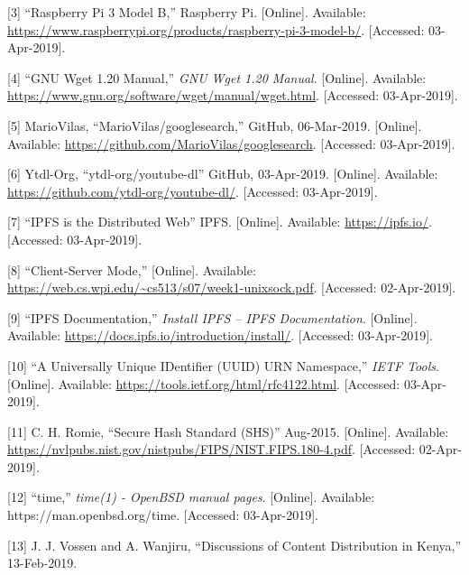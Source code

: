 \documentclass{article}
\begin{document}
[3] ``Raspberry Pi 3 Model B,'' Raspberry Pi. [Online]. Available:
\url{https://www.raspberrypi.org/products/raspberry-pi-3-model-b/}. [Accessed:
03-Apr-2019].

[4] ``GNU Wget 1.20 Manual,'' \textit{GNU Wget 1.20
  Manual}. [Online]. Available:
\url{https://www.gnu.org/software/wget/manual/wget.html}. [Accessed:
03-Apr-2019].

[5] MarioVilas, ``MarioVilas/googlesearch,'' GitHub,
06-Mar-2019. [Online]. Available:
\url{https://github.com/MarioVilas/googlesearch}. [Accessed:
03-Apr-2019].

[6] Ytdl-Org, ``ytdl-org/youtube-dl'' GitHub,
03-Apr-2019. [Online]. Available:
\url{https://github.com/ytdl-org/youtube-dl/}. [Accessed:
03-Apr-2019].

[7] ``IPFS is the Distributed Web'' IPFS. [Online]. Available:
\url{https://ipfs.io/}. [Accessed: 03-Apr-2019].

[8] ``Client-Server Mode,'' [Online]. Available:
\url{https://web.cs.wpi.edu/~cs513/s07/week1-unixsock.pdf}. [Accessed:
02-Apr-2019].

[9] ``IPFS Documentation,'' \textit{Install IPFS – IPFS Documentation}. [Online]. Available: \url{https://docs.ipfs.io/introduction/install/}. [Accessed: 03-Apr-2019]. 

[10] ``A Universally Unique IDentifier (UUID) URN Namespace,''
\textit{IETF Tools}. [Online]. Available:
\url{https://tools.ietf.org/html/rfc4122.html}. [Accessed:
03-Apr-2019].

[11] C. H. Romie, ``Secure Hash Standard (SHS)'' Aug-2015. [Online]. Available: \url{https://nvlpubs.nist.gov/nistpubs/FIPS/NIST.FIPS.180-4.pdf}. [Accessed: 02-Apr-2019].

[12] ``time,'' \textit{time(1) - OpenBSD manual pages}. [Online]. Available: https://man.openbsd.org/time. [Accessed: 03-Apr-2019].

[13] J. J. Vossen and A. Wanjiru, ``Discussions of Content Distribution in Kenya,'' 13-Feb-2019. 
\end{document}
